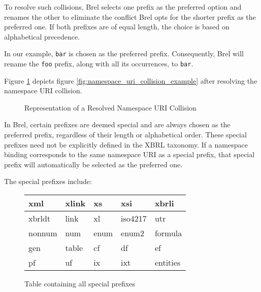 To resolve such collisions, Brel selects one prefix as the preferred option and renames the other to eliminate the conflict
Brel opts for the shorter prefix as the preferred one.
If both prefixes are of equal length, the choice is based on alphabetical precedence.

In our example, \texttt{bar} is chosen as the preferred prefix.
Consequently, Brel will rename the \texttt{foo} prefix, along with all its occurrences, to \texttt{bar}.

Figure \ref{fig:namespace_uri_collision_example_renamed} depicts figure \ref{fig:namespace_uri_collision_example} after resolving the namespace URI collision.

\begin{figure}[H]
\caption{Representation of a Resolved Namespace URI Collision}
\label{fig:namespace_uri_collision_example_renamed}
\end{figure}

In Brel, certain prefixes are deemed special and are always chosen as the preferred prefix, regardless of their length or alphabetical order.
These special prefixes need not be explicitly defined in the XBRL taxonomy.
If a namespace binding corresponds to the same namespace URI as a special prefix, that special prefix will automatically be selected as the preferred one.

The special prefixes include:

\begin{figure}[H]
    \centering
    \begin{tabular}{|l|l|l|l|l|}
        \hline
        xml & xlink & xs & xsi & xbrli \\
        \hline
        xbrldt & link & xl & iso4217 & utr \\
        \hline
        nonnum & num & enum & enum2 & formula \\
        \hline
        gen & table & cf & df & ef \\
        \hline
        pf & uf & ix & ixt & entities \\
        \hline
    \end{tabular}
    \caption{Table containing all special prefixes}
    \label{fig:special_prefixes}
\end{figure}

